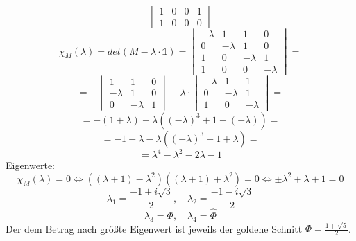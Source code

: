\begin{flushenum}
\[\begin{bmatrix}
                         1 & 0 & 0 & 1 \\ 1 & 0 & 0 & 0 \end{bmatrix} \]
  \[ \chi_M(\lambda) = det(M - \lambda \cdot \mathds{1})
     = \begin{vmatrix} -\lambda & 1 & 1 & 0 \\
                       0 & -\lambda & 1 & 0 \\
                       1 & 0 & -\lambda & 1 \\
                       1 & 0 & 0 & -\lambda \end{vmatrix} = \]
  \[ = -\begin{vmatrix} 1 & 1 & 0 \\ 
                        -\lambda & 1 & 0 \\
                        0 & -\lambda & 1 \end{vmatrix} - \lambda \cdot
        \begin{vmatrix} -\lambda & 1 & 1 \\
                        0 & -\lambda & 1 \\
                        1 & 0 & -\lambda \end{vmatrix} = \]
  \[ = -(1 + \lambda) - \lambda ((-\lambda)^3 + 1 - (-\lambda)) = \]
  \[ = - 1 - \lambda - \lambda ((-\lambda)^3 + 1 + \lambda) = \]
  \[ = \lambda^4 - \lambda^2 - 2\lambda - 1 \]
  Eigenwerte:
  \[ \chi_M(\lambda) = 0 \Leftrightarrow 
     ((\lambda + 1) - \lambda^2)((\lambda + 1) + \lambda^2) = 0
     \Leftrightarrow \pm \lambda^2 + \lambda + 1 = 0 \]
  \[ \lambda_1 = \frac{-1 + i\sqrt{3}}{2}, \quad
     \lambda_2 = \frac{-1 - i\sqrt{3}}{2} \]
  \[ \lambda_3 = \Phi, \quad \lambda_4 = \hat \Phi \]
  Der dem Betrag nach größte Eigenwert ist jeweils der goldene Schnitt $\Phi =
  \frac{1 + \sqrt{5}}{2}$.
\end{flushenum}
